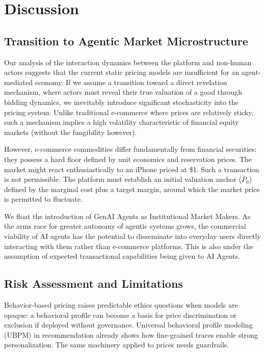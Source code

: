 \section{Discussion}
\label{sec:discussion}



\subsection{Transition to Agentic Market Microstructure}

Our analysis of the interaction dynamics between the platform and non-human actors suggests that the current static pricing models are insufficient for an agent-mediated economy. If we assume a transition toward a direct revelation mechanism, where actors must reveal their true valuation of a good through bidding dynamics, we inevitably introduce significant stochasticity into the pricing system. Unlike traditional e-commerce where prices are relatively sticky, such a mechanism implies a high volatility characteristic of financial equity markets (without the fungibility however).

However, e-commerce commodities differ fundamentally from financial securities: they possess a hard floor defined by unit economics and reservation prices. The market might react enthusiastically to an iPhone priced at \$1. Such a transaction is not permissible. The platform must establish an initial valuation anchor ($P_0$) defined by the marginal cost plus a target margin, around which the market price is permitted to fluctuate.

We float the introduction of GenAI Agents as Institutional Market Makers. As the arms race for greater autonomy of agentic systems grows, the commercial viability of AI agents has the potential to disseminate into everyday users directly interacting with them rather than e-commerce platforms. This is also under the assumption of expected transactional capabilities being given to AI Agents.

\subsection{Risk Assessment and Limitations}
\label{sec:limitations_risks}

Behavior-based pricing raises predictable ethics questions when models are opaque: a behavioral profile can become a basis for price discrimination or exclusion if deployed without governance. Universal behavioral profile modeling (UBPM) in recommendation already shows how fine-grained traces enable strong personalization. The same machinery applied to prices needs guardrails.


